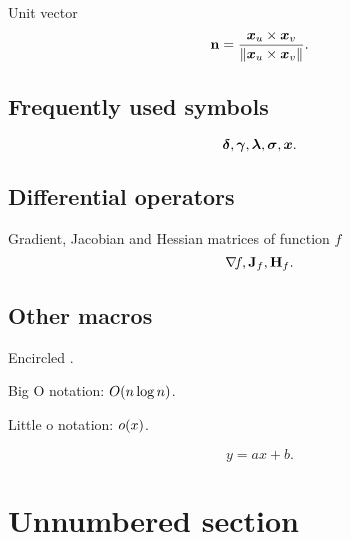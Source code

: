 Unit vector
\begin{equation}
	\mathbf{n} = \frac{ {\boldsymbol{x}_u} \times {\boldsymbol{x}_v} }{\left\| { {\boldsymbol{x}_u} \times {\boldsymbol{x}_v} } \right\|}.
\end{equation}

\subsection{Frequently used symbols}
\begin{equation}
	\boldsymbol{\delta}, \boldsymbol{\gamma}, \boldsymbol{\lambda}, \boldsymbol{\sigma}, \boldsymbol{x}.
\end{equation}

\subsection{Differential operators}
Gradient, Jacobian and Hessian matrices of function $f$
\begin{equation}
	\nabla \! {f}, \mathbf{J}_{f}, \mathbf{H}_{f}.
\end{equation}

\subsection{Other macros}
Encircled .\par
Big O notation:  $O\!\left( {n \log{}n} \right)$. \par
Little o notation:  $o\!\left( {x} \right)$. \par

\lipsum
\begin{equation}
	y = ax + b.
\end{equation}

\section*{Unnumbered section}

\lipsum[1-12]